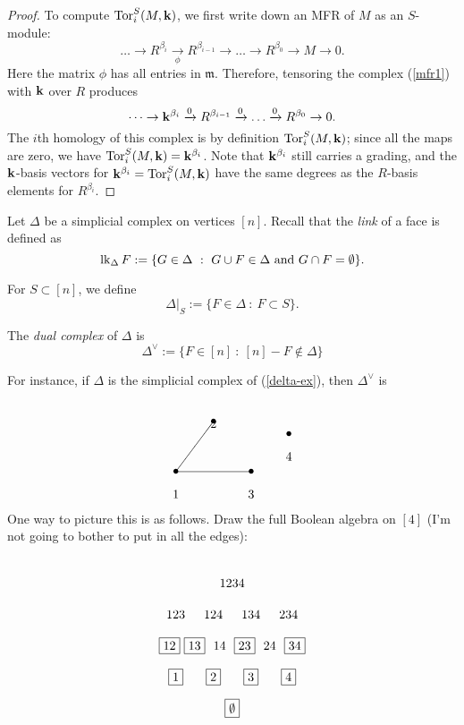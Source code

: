 \documentclass{amsart}
\newcommand{\link}{\mathop{\rm lk}\nolimits}
\newcommand{\Tor}{\mathop{\rm Tor}\nolimits}
\newcommand{\fld}{{\bf k}}
\newcommand{\mm}{{\mathfrak m}}
\newcommand{\defterm}[1] {{\it #1\/}}
\newcommand{\puttext}[2] {\put(#1){\makebox(0,0){#2}}}
\newcommand{\putdot}[1]  {\put(#1){\makebox(0,0){$\bullet$}}}
\newcommand{\putline}[3] {\put(#1){\line(#2){#3}}}
\begin{document}
\begin{proof}
To compute $\Tor^S_i(M,\fld)$, we first write down an MFR of $M$ as an $S$-module:
	\begin{equation} \label{mfr1}
	\dots \to R^{\beta_i} \xrightarrow[\phi]{} R^{\beta_{i-1}} \to \dots 
	\to R^{\beta_0} \to M \to 0.
	\end{equation}
Here the matrix $\phi$ has all entries in $\mm$.  Therefore, tensoring the complex 
(\ref{mfr1}) with $\fld$ over $R$ produces
	\begin{equation} \label{mfr2}
	\dots \to \fld^{\beta_i} \xrightarrow{0} R^{\beta_{i-1}} \xrightarrow{0} \dots 
	\xrightarrow{0} R^{\beta_0} \to 0.
	\end{equation}
The $i$th homology of this complex is by definition $\Tor^S_i(M,\fld)$; since all the maps are 
zero, we have $\Tor^S_i(M,\fld) = \fld^{\beta_i}$.  Note that $\fld^{\beta_i}$
still carries a grading, and the $\fld$-basis vectors for
$\fld^{\beta_i}=\Tor^S_i(M,\fld)$ have the same degrees as
the $R$-basis elements for $R^{\beta_i}$.
\end{proof}

Let $\Delta$ be a simplicial complex on vertices $[n]$.  Recall that the \defterm{link} of a
face is defined as
	$$\link_\Delta F := \{G \in \Delta ~:~ G \cup F \in \Delta ~\text{and}~ G \cap F 
	= \emptyset\}.$$

For $S \subset [n]$, we define
	$$\Delta|_S := \{F \in \Delta ~:~ F \subset S\}.$$

The \defterm{dual complex} of $\Delta$ is
	$$\Delta^\vee := \{F \in [n] ~:~ [n]-F \not\in \Delta\}$$

For instance, if $\Delta$ is the simplicial complex of (\ref{delta-ex}), then $\Delta^\vee$ is
        \begin{equation} \label{alex}
        \begin{picture}(110,80)
	\putdot{10,20}  \puttext{10, 2}{$1$}
	\putdot{40,60}  \puttext{40,58}{$2$}
	\putdot{70,20}  \puttext{70, 2}{$3$}
	\putdot{100,50}  \puttext{100,32}{$4$}
        \putline{10,20}{3,4}{30}	%
        \putline{10,20}{1,0}{60}	%
        \end{picture}
        \end{equation}

One way to picture this is as follows.  Draw the full Boolean algebra on $[4]$ (I'm not going 
to bother to put in all the edges):

        \begin{equation} \label{boolalg}
        \begin{picture}(200,120)
	\puttext{100,100}{$1234$}
	\puttext{ 55,75}{$123$}
	\puttext{ 85,75}{$124$}
	\puttext{115,75}{$134$}
	\puttext{145,75}{$234$}
	\puttext{ 50,50}{\fbox{$12$}}
	\puttext{ 70,50}{\fbox{$13$}}
	\puttext{ 90,50}{$14$}
	\puttext{110,50}{\fbox{$23$}}
	\puttext{130,50}{$24$}
	\puttext{150,50}{\fbox{$34$}}
	\puttext{ 55,25}{\fbox{$1$}}
	\puttext{ 85,25}{\fbox{$2$}}
	\puttext{115,25}{\fbox{$3$}}
	\puttext{145,25}{\fbox{$4$}}
	\puttext{100, 0}{\fbox{$\emptyset$}}
        \end{picture}
        \end{equation}
\end{document}
